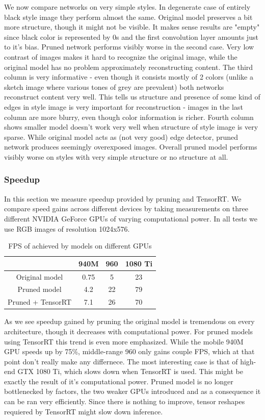 \documentclass[../Main.tex]{subfiles}
\begin{document}
We now compare networks on very simple styles. In degenerate case of entirely black
style image they perform almost the same. Original model preserves a bit more 
structure, though it might not be visible. It makes sense results are "empty"
since black color is represented by $0$s and the first convolution layer amounts
just to it's bias. Pruned network performs visibly worse in the second case.
Very low contrast of images makes it hard to recognize the original image, while
the original model has no problem approximately reconstructing content. 
The third column is very informative - even though it consists mostly of 2 colors
(unlike a sketch image where various tones of grey are prevalent) both networks
reconstruct content very well. This tells us structure and presence of some kind
of edges in style image is very important for reconstruction - images in the last
column are more blurry, even though color information is richer.
Fourth column shows smaller model  doesn't work very well when structure of style 
image is very sparse. While original model acts as (not very good) edge detector,
pruned network produces seemingly overexposed images.
Overall pruned model performs visibly worse on styles with very simple structure or no
structure at all. 
\subsubsection{Speedup}
In this section we measure speedup provided by pruning and TensorRT. 
We compare speed gains across different devices by taking measurements on three different
NVIDIA GeForce GPUs of varying computational power. In all tests we use RGB images
of resolution 1024x576. 
\begin{table}
\begin{center}
\begin{tabular}{|c|c|c|c|}
\hline
                  &  940M & 960 & 1080 Ti \\
\hline
Original model    &  0.75 & 5   & 23 \\
\hline
Pruned model      &  4.2  & 22  & 79 \\
\hline
Pruned + TensorRT &  7.1  & 26  & 70 \\
\hline
\end{tabular}
\end{center}
\caption{\label{table:speedup} FPS of achieved by models on different GPUs}
\end{table}
As we see speedup gained by pruning the original model is tremendous on
every architecture, though it decreases with computational power.
For pruned models using TensorRT this trend is even more emphasized.
While the mobile 940M GPU speeds up by 75\%, middle-range 960 only gains
couple FPS, which at that point don't really make any differnece. The most
interesting case is that of high-end GTX 1080 Ti, which slows down
when TensorRT is used. This might be exactly the result of it's computational power.
Pruned model is no longer bottlenecked by factors, the two weaker GPUs
introduced and as a consequence it can be ran very efficiently.
Since there is nothing to improve, tensor reshapes requiered by TensorRT
might slow down inference.
\end{document}

